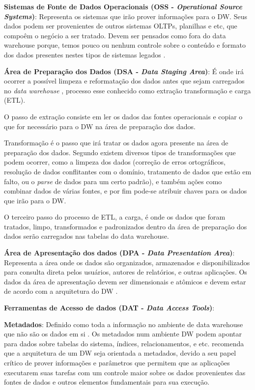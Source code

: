 \textbf{Sistemas de Fonte de Dados Operacionais (OSS - \textit{Operational Source Systems})}:
Representa os sistemas que irão prover informações para o DW. Seus dados podem ser provenientes de outros sistemas OLTPs, planilhas e etc, que compoêm o negócio a ser tratado. Devem ser pensados como fora do data warehouse porque, temos pouco ou nenhum controle sobre o conteúdo e formato dos dados presentes nestes tipos de sistemas legados \cite{Kimball2002}.

\textbf{Área de Preparação dos Dados (DSA - \textit{Data Staging Area})}:
É onde irá ocorrer a possível limpeza e reformatação dos dados antes que sejam carregados no \textit{data warehouse} \cite{elmasri_sistemas_2011}, processo esse conhecido como extração transformação e carga (ETL).

O passo de extração consiste em ler os dados das 
fontes operacionais
e copiar o que for necessário para o DW na área de preparação dos dados.

Transformação é o passo que irá tratar os dados agora presente na área de preparação dos dados. Segundo  
existem diversos tipos de transformações que podem ocorrer, como a limpeza dos dados (correção de erros ortográficos, resolução de dados conflitantes com o domínio, tratamento de dados que estão em falto, ou o 
\textit{parse}
de dados para um certo padrão), e também ações como combinar dados de várias fontes, e por fim pode-se atribuir chaves para os dados que irão para o DW.

O terceiro passo do processo de ETL, a carga, é onde os dados que foram tratados, limpo, transformados e padronizados dentro da área de preparação dos dados serão carregados nas tabelas do data warehouse.

\textbf{Área de Apresentação dos dados (DPA - \textit{Data Presentation Area})}:
Representa a área onde os dados são organizados, armazenados e disponibilizados para consulta direta pelos usuários, autores de relatórios, e outras aplicações. Os dados da área de apresentação devem ser dimensionais e atômicos e devem estar de acordo com a arquitetura do DW \cite{Kimball2002}.


\textbf{Ferramentas de Acesso de dados (DAT - \textit{Data Access Tools})}:

\textbf{Metadados}: Definido como toda a informação no ambiente de data warehouse que não são os dados em si \cite{Kimball2002}. Os metadados num ambiente DW podem apontar para dados sobre tabelas do sistema, índices, relacionamentos, e etc.  recomenda que a arquitetura de um DW seja orientada a metadados, devido a seu papel crítico de prover informações e parâmetros que permitem que as aplicações executarem suas tarefas com um controle maior sobre os dados provenientes das fontes de dados e outros elementos fundamentais para sua execução.


